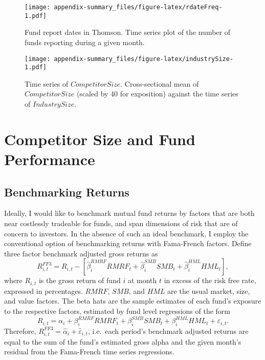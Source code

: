 \documentclass[]{book}
\theoremstyle{definition}
\theoremstyle{definition}
\theoremstyle{definition}
\theoremstyle{remark}
\begin{document}
\begin{figure}
\centering
\texttt{[image: appendix-summary\_files/figure-latex/rdateFreq-1.pdf]}
\caption{\label{fig:rdateFreq}Fund report dates in Thomson. Time series plot
of the number of funds reporting during a given month.}
\end{figure}

\begin{figure}
\centering
\texttt{[image: appendix-summary\_files/figure-latex/industrySize-1.pdf]}
\caption{\label{fig:industrySize}Time series of \(CompetitorSize\).
Cross-sectional mean of \(CompetitorSize\) (scaled by 40 for exposition)
against the time series of \(IndustrySize\).}
\end{figure}

\hypertarget{sec:CSandPerformance}{%
\chapter{Competitor Size and Fund
Performance}\label{sec:CSandPerformance}}

\hypertarget{sec:benchmark}{%
\section{Benchmarking Returns}\label{sec:benchmark}}

Ideally, I would like to benchmark mutual fund returns by factors that
are both near costlessly tradeable for funds, and span dimensions of
risk that are of concern to investors. In the absence of such an ideal
benchmark, I employ the conventional option of benchmarking returns with
Fama-French factors. Define three factor benchmark adjusted gross
returns as \begin{equation}
R^{FF3}_{i,t} = R_{i,t} - \left[ \hat{\beta}^{RMRF}_i RMRF_t + \hat{\beta}^{SMB}_i SMB_t + \hat{\beta}^{HML}_i HML_t \right],
\end{equation} where \(R_{i,t}\) is the gross return of fund \(i\) at
month \(t\) in excess of the risk free rate, expressed in percentages.
\(RMRF\), \(SMB\), and \(HML\) are the usual market, size, and value
factors. The beta hats are the sample estimates of each fund's exposure
to the respective factors, estimated by fund level regressions of the
form \begin{equation}
R_{i,t} = \alpha_i + \beta^{RMRF}_i RMRF_t + \beta^{SMB}_i SMB_t + \beta^{HML}_i HML_t + \varepsilon_{i,t}.
\end{equation} Therefore,
\(R^{FF3}_{i,t} = \hat{\alpha}_i + \hat{\varepsilon}_{i,t}\), i.e.~each
period's benchmark adjusted returns are equal to the sum of the fund's
estimated gross alpha and the given month's residual from the
Fama-French time series regressions.
\end{document}
